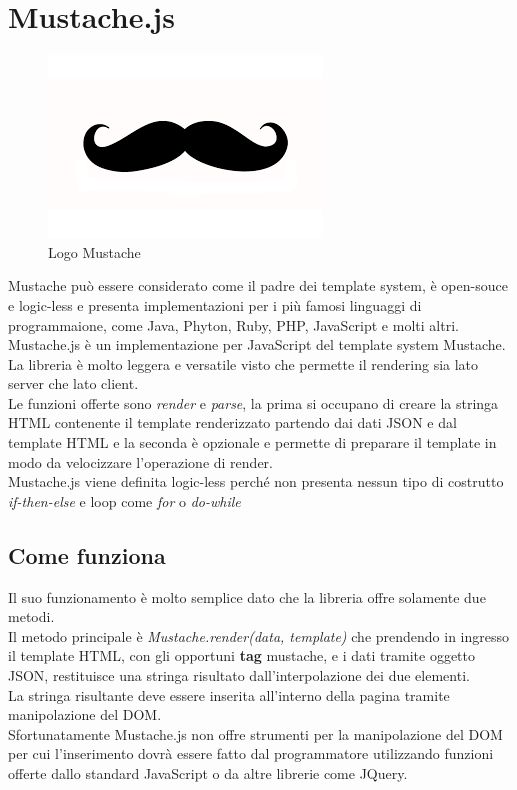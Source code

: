 \newpage

\section{Mustache.js}

\begin{figure}[htp]
	\centering
	\includegraphics[width=\textwidth/2]{../immagini/mustache_logo}
	\caption{Logo  Mustache}
\end{figure}

Mustache può essere considerato come il padre dei template system, è open-souce e logic-less e presenta implementazioni per i più famosi linguaggi di programmaione, come Java, Phyton, Ruby, PHP, JavaScript e molti altri.\\
Mustache.js è un implementazione per JavaScript del template system Mustache.\\
La libreria è molto leggera e versatile visto che permette il rendering sia lato server che lato client.\\
Le funzioni offerte sono \textit{render} e \textit{parse}, la prima si occupano di creare la stringa HTML contenente il template renderizzato partendo dai dati JSON e dal template HTML e la seconda è opzionale e permette di preparare il template in modo da velocizzare l'operazione di render.\\
Mustache.js viene definita logic-less perché non presenta nessun tipo di costrutto \textit{if-then-else} e loop come \textit{for} o \textit{do-while}
\subsection{Come funziona}
Il suo funzionamento è molto semplice dato che la libreria offre solamente due metodi.\\
Il metodo principale è \textit{Mustache.render(data, template)} che prendendo in ingresso il template HTML, con gli opportuni \textbf{tag} mustache, e i dati tramite oggetto JSON, restituisce una stringa risultato dall'interpolazione dei due elementi.\\
La stringa risultante deve essere inserita all'interno della pagina tramite manipolazione del DOM.\\
Sfortunatamente Mustache.js non offre strumenti per la manipolazione del DOM per cui l'inserimento dovrà essere fatto dal programmatore utilizzando funzioni offerte dallo standard JavaScript o da altre librerie come JQuery.
